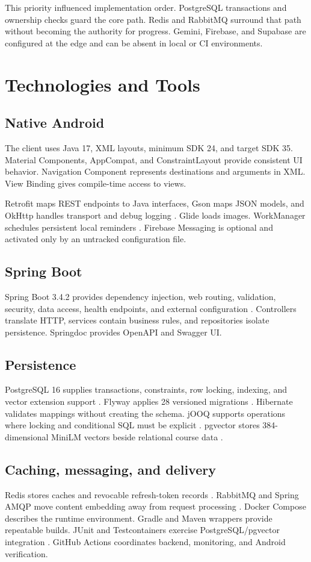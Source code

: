 \documentclass[12pt,a4paper,oneside]{report}
\newcommand{\migrationcount}{28}
\begin{document}
This priority influenced implementation order. PostgreSQL transactions and ownership
checks guard the core path. Redis and RabbitMQ surround that path without becoming
the authority for progress. Gemini, Firebase, and Supabase are configured at the edge
and can be absent in local or CI environments.

\chapter{Technologies and Tools}
\section{Native Android}
The client uses Java 17, XML layouts, minimum SDK 24, and target SDK 35. Material
Components, AppCompat, and ConstraintLayout provide consistent UI behavior.
Navigation Component represents destinations and arguments in XML. View Binding
gives compile-time access to views.

Retrofit maps REST endpoints to Java interfaces, Gson maps JSON models, and OkHttp
handles transport and debug logging \cite{retrofit}. Glide loads images. WorkManager
schedules persistent local reminders \cite{workmanager}. Firebase Messaging is
optional and activated only by an untracked configuration file.

\section{Spring Boot}
Spring Boot 3.4.2 provides dependency injection, web routing, validation, security,
data access, health endpoints, and external configuration \cite{springboot}.
Controllers translate HTTP, services contain business rules, and repositories
isolate persistence. Springdoc provides OpenAPI and Swagger UI.

\section{Persistence}
PostgreSQL 16 supplies transactions, constraints, row locking, indexing, and vector
extension support \cite{postgresql}. Flyway applies \migrationcount{} versioned migrations
\cite{flyway}. Hibernate validates mappings without creating the schema. jOOQ
supports operations where locking and conditional SQL must be explicit \cite{jooq}.
pgvector stores 384-dimensional MiniLM vectors beside relational course data
\cite{pgvector}.

\section{Caching, messaging, and delivery}
Redis stores caches and revocable refresh-token records \cite{redis}. RabbitMQ and
Spring AMQP move content embedding away from request processing \cite{rabbitmq}.
Docker Compose describes the runtime environment. Gradle and Maven wrappers provide
repeatable builds. JUnit and Testcontainers exercise PostgreSQL/pgvector integration
\cite{testcontainers}. GitHub Actions coordinates backend, monitoring, and Android
verification.
\end{document}
